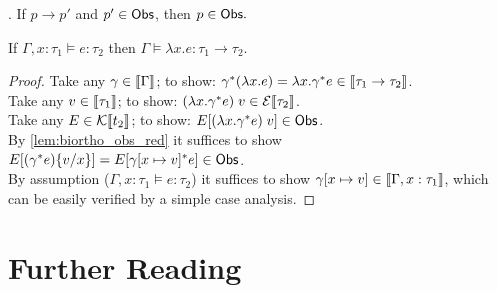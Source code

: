 \begin{lemma}\label{lem:biortho_obs_red}.
  If $p \longrightarrow p'$ and $p' \in \mathsf{Obs}$, then $p \in \mathsf{Obs}.$
\end{lemma}

\begin{lemma}
  If $\Gamma,x : \tau_1 \models e : \tau_2$
  then $\Gamma\models \lambda x.e : \tau_1 \to \tau_2$.
\end{lemma}
\begin{proof}
  Take any $\gamma \in \llbracket\Gamma\rrbracket$;
    to show: $\gamma^*(\lambda x.e) =
      \lambda x.\gamma^* e \in \llbracket\tau_1 \to \tau_2\rrbracket$. \\
  Take any $v \in \llbracket\tau_1\rrbracket$;
    to show: $(\lambda x.\gamma^* e)\;v \in \mathcal{E}\llbracket\tau_2\rrbracket$.\\
  Take any $E \in \mathcal{K}\llbracket t_2\rrbracket$;
    to show: $E[(\lambda x.\gamma^* e)\;v] \in \mathsf{Obs}$.\\
  By \autoref{lem:biortho_obs_red} it suffices to show
    $E[(\gamma^* e)\{v/x\}] = E[\gamma[x\mapsto v]^* e] \in \mathsf{Obs}$. \\
  By assumption ($\Gamma,x : \tau_1\models e : \tau_2$)
    it suffices to show $\gamma[x\mapsto v] \in \llbracket\Gamma,x : \tau_1\rrbracket$,
    which can be easily verified by a simple case analysis.
\end{proof}

\section{Further Reading}

